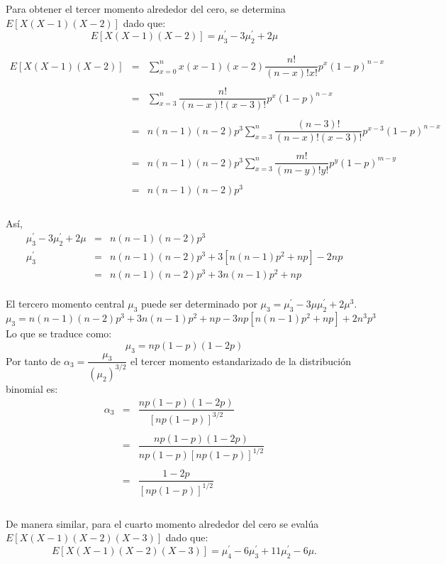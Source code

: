 \vspace{1cm}

Para obtener el tercer momento alrededor del cero, se determina $E[X(X-1)(X-2)]$ dado que:
$$E[X(X-1)(X-2)]=\mu_3^{'} - 3\mu_2^{'} + 2\mu$$

$$\begin{array}{rcl}
    E[X(X-1)(X-2)]&=&\sum\limits_{x=0}^n x(x-1)(x-2)\dfrac{n!}{(n-x)!x!} p^x(1-p)^{n-x}\\\\
		  &=&\sum\limits_{x=3}^n \dfrac{n!}{(n-x)!(x-3)!}p^x(1-p)^{n-x}\\\\
		  &=&n(n-1)(n-2)p^3 \sum_{x=3}^n \dfrac{(n-3)!}{(n-x)!(x-3)!}p^{x-3}(1-p)^{n-x}\\\\
		  &=&n(n-1)(n-2)p^3 \sum_{x=3}^n \dfrac{m!}{(m-y)!y!}p^{y}(1-p)^{m-y}\\\\
		  &=&n(n-1)(n-2)p^3\\\\
\end{array}$$

Así,
$$\begin{array}{rcl}
    \mu_3^{'}-3\mu_2^{'}+2\mu&=&n(n-1)(n-2)p^3\\
    \mu_3^{'}&=&n(n-1)(n-2)p^3+3[n(n-1)p^2+np]-2np\\
	     &=&n(n-1)(n-2)p^3+3n(n-1)p^2+np\\
\end{array}$$

El tercero momento central $\mu_3$ puede ser determinado por $\mu_3 = \mu_3^{'}-3\mu\mu_2^{'} + 2\mu^3$.
$$\mu_3 = n(n-1)(n-2)p^3 +3n(n-1)p^2 + np-3np[n(n-1)p^2+np]+2n^3p^3$$
Lo que se traduce como:
$$\mu_3=np(1-p)(1-2p)$$
Por tanto de $\alpha_3 = \dfrac{\mu_3}{(\mu_2)^{3/2}}$ el tercer momento estandarizado de la distribución binomial es:
$$\begin{array}{rcl}
    \alpha_3&=&\dfrac{np(1-p)(1-2p)}{[np(1-p)]^{3/2}}\\\\
	    &=&\dfrac{np(1-p)(1-2p)}{np(1-p)[np(1-p)]^{1/2}}\\\\
	    &=&\dfrac{1-2p}{[np(1-p)]^{1/2}}\\\\
\end{array}$$


De manera similar, para el cuarto momento alrededor del cero se evalúa $E[X(X-1)(X-2)(X-3)]$ dado que:
$$E[X(X-1)(X-2)(X-3)] = \mu_4^{'}-6\mu_3^{'}+11\mu_2^{'}-6\mu.$$

